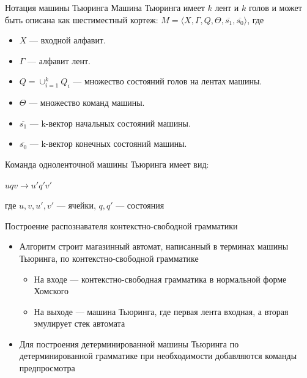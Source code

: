 \documentclass[xcolor=table]{beamer}
\begin{document}
\begin{frame}[fragile]{Нотация машины Тьюринга}
Машина Тьюринга имеет $ k $ лент и $ k $ голов и может быть описана как шестиместный кортеж:
$M = \langle X, \Gamma, Q, \Theta, \overline{s_1}, \overline{s_0} \rangle$,
где
\begin{itemize}
    \item $X$ --- входной алфавит.
    \item $\Gamma$ --- алфавит лент.
    \item $Q = \cup_{i=1}^k Q_i$ --- множество состояний голов на лентах машины.
    \item $\Theta$ --- множество команд машины.
    \item $\overline{s_1}$ --- k-вектор начальных состояний машины.
    \item $\overline{s_0}$ --- k-вектор конечных состояний машины.
\end{itemize}

Команда одноленточной машины Тьюринга имеет вид: 
\begin{center}
    $u q v \to u' q' v'$
\end{center}
где $u, v, u', v'$ --- ячейки, $q, q'$ --- состояния

\end{frame}

\begin{frame}[fragile]{Построение распознавателя контекстно-свободной грамматики}
    \begin{itemize}
        \item Алгоритм строит магазинный автомат, написанный в терминах машины Тьюринга, по контекстно-свободной грамматике
        \begin{itemize}
            \item На входе --- контекстно-свободная грамматика в нормальной форме Хомского
            \item На выходе --- машина Тьюринга, где первая лента входная, а вторая эмулирует стек автомата
        \end{itemize}
        \item Для построения детерминированной машины Тьюринга по детерминированной грамматике при необходимости добавляются команды предпросмотра
    \end{itemize}
\end{frame}
\end{document}
